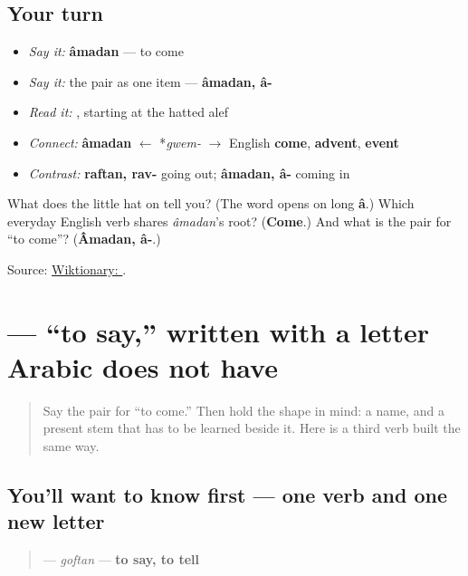 \subsection*{Your turn}
\begin{itemize}
\raggedright
  \item \emph{Say it:} \textbf{âmadan} — to come
  \item \emph{Say it:} the pair as one item — \textbf{âmadan, â-}
  \item \emph{Read it:} \textbf{}, starting at the hatted alef
  \item \emph{Connect:} \textbf{âmadan} $\leftarrow$ *\emph{gwem-} $\to$ English \textbf{come}, \textbf{advent}, \textbf{event}
  \item \emph{Contrast:} \textbf{raftan, rav-} going out; \textbf{âmadan, â-} coming in
\end{itemize}

\begin{tcolorbox}[breakable,colback=teal!4,colframe=teal!35!black,title={Before you move on}]
What does the little hat on \textbf{} tell you? (The word opens on long \textbf{â}.) Which everyday English verb shares \emph{âmadan}'s root? (\textbf{Come}.) And what is the pair for “to come”? (\textbf{Âmadan, â-}.)

Source: \href{https://en.wiktionary.org/wiki/\%D8\%A2\%D9\%85\%D8\%AF\%D9\%86}{Wiktionary: }.
\end{tcolorbox}
\section[\texorpdfstring{\fa{گفتن} (goftan)}{گفتن (goftan)}]{ — “to say,” written with a letter Arabic does not have}

\label{lesson:FA-C06-goftan}



\begin{quote}
Say the pair for “to come.” Then hold the shape in mind: a name, and a present stem that has to be learned beside it. Here is a third verb built the same way.
\end{quote}

\subsection*{You'll want to know first — one verb and one new letter}
\begin{quote}
\textbf{} — \emph{goftan} — \textbf{to say, to tell}
\end{quote}

